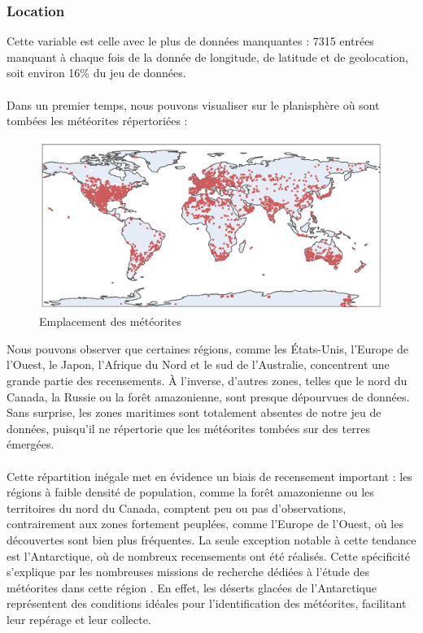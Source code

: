 \documentclass[12pt]{article}
\begin{document}
\subsubsection*{Location}
Cette variable est celle avec le plus de données manquantes : 7315 entrées manquant à chaque fois de la donnée de longitude, de latitude et de geolocation, soit environ 16\% du jeu de données.\\
\\
Dans un premier temps, nous pouvons visualiser sur le planisphère où sont tombées les météorites répertoriées :\\
\begin{figure}[H]
\centering
\includegraphics[width=14cm]{Images/exploration/points_monde.png}
\caption{Emplacement des météorites}
\end{figure}
Nous pouvons observer que certaines régions, comme les États-Unis, l’Europe de l’Ouest, le Japon, l’Afrique du Nord et le sud de l’Australie, concentrent une grande partie des recensements. À l’inverse, d’autres zones, telles que le nord du Canada, la Russie ou la forêt amazonienne, sont presque dépourvues de données. Sans surprise, les zones maritimes sont totalement absentes de notre jeu de données, puisqu’il ne répertorie que les météorites tombées sur des terres émergées.\\
\\
Cette répartition inégale met en évidence un biais de recensement important : les régions à faible densité de population, comme la forêt amazonienne ou les territoires du nord du Canada, comptent peu ou pas d’observations, contrairement aux zones fortement peuplées, comme l’Europe de l’Ouest, où les découvertes sont bien plus fréquentes. La seule exception notable à cette tendance est l’Antarctique, où de nombreux recensements ont été réalisés. Cette spécificité s’explique par les nombreuses missions de recherche dédiées à l’étude des météorites dans cette région \cite{Mission_recherche_antartictique}. En effet, les déserts glacées de l’Antarctique représentent des conditions idéales pour l’identification des météorites, facilitant leur repérage et leur collecte.\\
\end{document}
